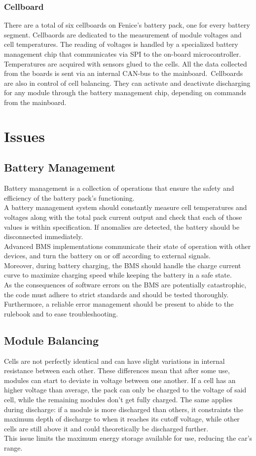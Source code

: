 \subsubsection{Cellboard}
There are a total of six cellboards on Fenice's battery pack, one for every battery segment. Cellbaords are dedicated to the measurement of module voltages and cell temperatures. The reading of voltages is handled by a specialized battery management chip that communicates via SPI to the on-board microcontroller. Temperatures are acquired with sensors glued to the cells. All the data collected from the boards is sent via an internal CAN-bus to the mainboard.\
Cellboards are also in control of cell balancing. They can activate and deactivate discharging for any module through the battery management chip, depending on commands from the mainboard.

\section{Issues}
\subsection{Battery Management}
Battery management is a collection of operations that ensure the safety and efficiency of the battery pack's functioning.\\
A battery management system should constantly measure cell temperatures and voltages along with the total pack current output and check that each of those values is within specification. If anomalies are detected, the battery should be disconnected immediately.\\
Advanced BMS implementations communicate their state of operation with other devices, and turn the battery on or off according to external signals.\\
Moreover, during battery charging, the BMS should handle the charge current curve to maximize charging speed while keeping the battery in a safe state.\\
As the consequences of software errors on the BMS are potentially catastrophic, the code must adhere to strict standards and should be tested thoroughly. Furthermore, a reliable error management should be present to abide to the rulebook and to ease troubleshooting.

\subsection{Module Balancing}
Cells are not perfectly identical and can have slight variations in internal resistance between each other. These differences mean that after some use, modules can start to deviate in voltage between one another. If a cell has an higher voltage than average, the pack can only be charged to the voltage of said cell, while the remaining modules don't get fully charged. The same applies during discharge: if a module is more discharged than others, it constraints the maximum depth of discharge to when it reaches its cutoff voltage, while other cells are still above it and could theoretically be discharged further.\\
This issue limits the maximum energy storage available for use, reducing the car's range.

